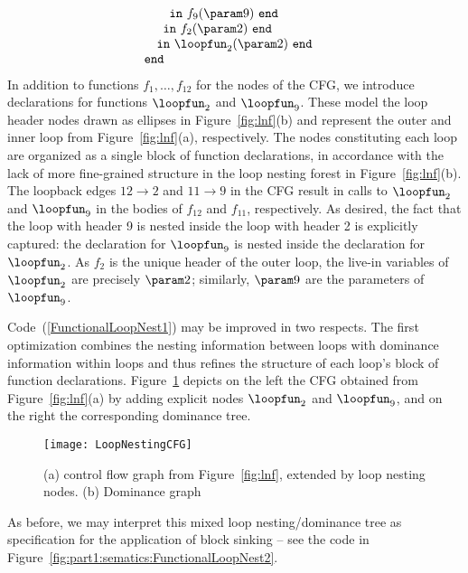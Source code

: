 \begin{equation}
\begin{array}{l}
\begin{array}{l}
\begin{array}[t]{l}
\begin{array}[t]{l}
\begin{array}[t]{l}
                             \mathtt{in}\ f_9(\param 9)\ \mathtt{end}
                          \end{array}\\
               \mathtt{in}\ f_2(\param 2)\ \mathtt{end}
             \end{array}\\
       \mathtt{in}\ \loopfun_2(\param 2)\ \mathtt{end}
     \end{array}
  \end{array}\\ 
\mathtt{end}
\end{array} 
\end{equation}
In addition to functions $f_1, \ldots, f_{12}$ for the nodes of the
CFG, we introduce declarations for functions $\loopfun_2$ and
$\loopfun_9$. These model the loop header nodes drawn as ellipses in
Figure~\ref{fig:lnf}(b) and represent the outer and inner loop from
Figure~\ref{fig:lnf}(a), respectively.  The nodes constituting each
loop are organized as a single block of function declarations, in
accordance with the lack of more fine-grained structure in the loop
nesting forest in Figure~\ref{fig:lnf}(b). The loopback edges $12 \to
2$ and $11 \to 9$ in the CFG result in calls to $\loopfun _2$ and
$\loopfun_9$ in the bodies of $f_{12}$ and $f_{11}$, respectively.  As
desired, the fact that the loop with header 9 is nested inside the
loop with header 2 is explicitly captured: the declaration for
$\loopfun_9$ is nested inside the declaration for $\loopfun_2$.  As
$f_2$ is the unique header of the outer loop, the live-in variables of
$\loopfun_2$ are precisely $\param 2$; similarly, $\param 9$ are the
parameters of $\loopfun_9$.

Code~(\ref{FunctionalLoopNest1}) may be improved in two respects. The
first optimization combines the nesting information between loops with
dominance information within loops and thus refines the structure of
each loop's block of function declarations.
Figure~\ref{FigureCFGForLoopNestFromChapter4} depicts on the left the
CFG obtained from Figure~\ref{fig:lnf}(a) by adding explicit nodes
$\loopfun_2$ and $\loopfun_9$, and on the right the corresponding
dominance tree.
\begin{figure}
\begin{center}
\texttt{[image: LoopNestingCFG]}
\end{center}
\caption{\label{FigureCFGForLoopNestFromChapter4} (a) control flow graph from Figure~\ref{fig:lnf}, extended by loop nesting nodes. (b) Dominance graph}
\end{figure} As before, we may interpret
this mixed loop nesting/dominance tree as specification for the
application of block sinking -- see the code in
Figure~\ref{fig:part1:sematics:FunctionalLoopNest2}.

